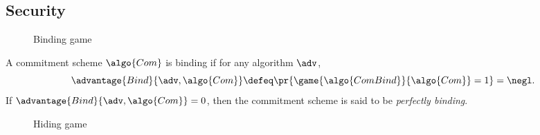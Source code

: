 \subsection{Security}

\begin{figure}[tbhp]
  \begin{center}
    \begin{tcolorbox}[width=8cm]
      \begin{pchstack}[center]
      \end{pchstack}
    \end{tcolorbox}
  \end{center}
  \caption{Binding game \label{fig:break-com-bind}}
\end{figure}

\begin{definition}[Binding]
  A commitment scheme $\algo{Com}$ is binding if for any \ppt algorithm $\adv$,
 \[
  \advantage{Bind}{\adv, \algo{Com}} \defeq \pr{\game{\algo{ComBind}}{\algo{Com}} = 1} = \negl.
 \]
 If $\advantage{Bind}{\adv, \algo{Com}} = 0$, then the commitment scheme is said to be \emph{perfectly binding}.
\end{definition}

\begin{figure}[tbhp]
  \begin{center}
    \begin{tcolorbox}[width=8cm]
      \begin{pchstack}[center]
      \end{pchstack}
    \end{tcolorbox}
  \end{center}
  \caption{Hiding game \label{fig:break-com-hid}}
\end{figure}


